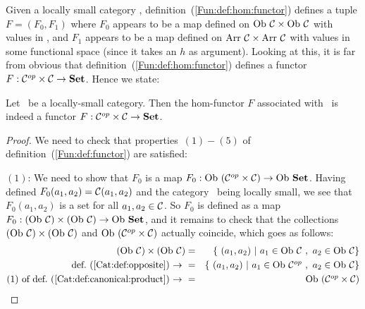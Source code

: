 Given a locally small category \Cat, definition~(\ref{Fun:def:hom:functor}) 
defines a tuple $F=(F_{0},F_{1})$ where $F_{0}$ appears to be a map defined 
on $\ob\ \Cat\times\ob\ \Cat$ with values in \Set, and $F_{1}$ appears to be 
a map defined on $\arr\ \Cat\times\arr\ \Cat$ with values in some functional 
space (since it takes an $h$ as argument). Looking at this, it is far from 
obvious that definition~(\ref{Fun:def:hom:functor}) defines a functor 
$F:\mbox{${\cal C}^{op}$}\times\mbox{$\cal C$}\to\mbox{\bf Set}$. Hence we state:
\begin{prop}\label{Fun:prop:hom:functor}
    Let \Cat\ be a locally-small category. Then the hom-functor $F$ associated 
    with \Cat\ is indeed a functor $F:\mbox{${\cal C}^{op}$}\times\mbox{$\cal C$}\to\mbox{\bf Set}$.
\end{prop}
\begin{proof}
    We need to check that properties~$(1)-(5)$ of 
    definition~(\ref{Fun:def:functor}) are satisfied:

    $(1)$: We need to show that $F_{0}$ is a map $F_{0}:\mbox{\rm Ob}\ (\mbox{${\cal C}^{op}$}\times\mbox{$\cal C$})
    \to\mbox{\rm Ob}\ \mbox{\bf Set}$. Having defined $F_{0}(a_{1},a_{2})=\mbox{$\cal C$}(a_{1},a_{2})$ and
    the category \Cat\ being locally small, we see that $F_{0}(a_{1},a_{2})$
    is a set for all $a_{1},a_{2}\in\mbox{$\cal C$}$. So $F_{0}$ is defined as a map
    $F_{0}:(\ob\ \Cat)\times(\ob\ \Cat)\to\ob\ \Set$, and it remains to check
    that the collections $(\ob\ \Cat)\times(\ob\ \Cat)$ and $\mbox{\rm Ob}\ (\mbox{${\cal C}^{op}$}\times
    \mbox{$\cal C$})$ actually coincide, which goes as follows:
        \begin{eqnarray*}(\ob\ \Cat)\times(\ob\ \Cat)
            &=&\{\ (a_{1},a_{2})\ |\ a_{1}\in\ob\ \Cat\ ,\ a_{2}\in\ob\ \Cat\}\\
            \mbox{def.~(\ref{Cat:def:opposite})\ $\to$\ }
            &=&\{\ (a_{1},a_{2})\ |\ a_{1}\in\ob\ \Cop\ ,\ a_{2}\in\ob\ \Cat\}\\
            \mbox{$(1)$ of def.~(\ref{Cat:def:canonical:product})\ $\to$\ }
            &=&\ob\ (\Cop\times\Cat)
        \end{eqnarray*}


\end{proof}
